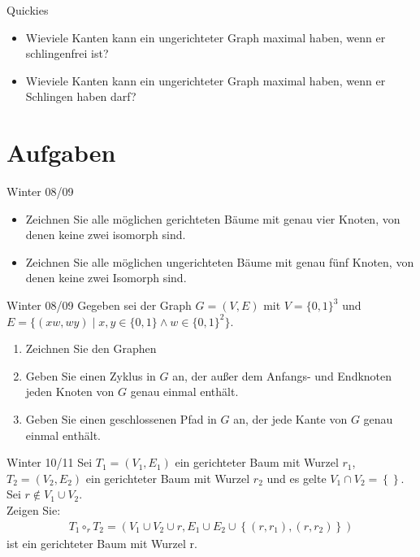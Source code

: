 \begin{frame}{Quickies}
    \begin{itemize}
        \item Wieviele Kanten kann ein ungerichteter Graph maximal haben, wenn er schlingenfrei ist? 
        \item Wieviele Kanten kann ein ungerichteter Graph maximal haben, wenn er Schlingen haben darf? 
    \end{itemize}
\end{frame}

\section{Aufgaben}
\begin{frame}{Winter 08/09}
    \begin{itemize}
        \item Zeichnen Sie alle möglichen gerichteten Bäume mit genau vier Knoten, von denen keine zwei isomorph sind.
        \item Zeichnen Sie alle möglichen ungerichteten Bäume mit genau fünf Knoten, von denen keine zwei Isomorph sind.
    \end{itemize}
\end{frame}

\begin{frame}{Winter 08/09}
    Gegeben sei der Graph $G=(V, E)$ mit $V=\{0, 1\}^3$ und $E=\{(xw, wy) \mid x, y \in \{0, 1\} \land w \in \{0, 1\}^2\}$.
    \begin{enumerate}
        \item Zeichnen Sie den Graphen
        \item Geben Sie einen Zyklus in $G$ an, der außer dem Anfangs- und Endknoten jeden Knoten von $G$ genau einmal enthält.
        \item Geben Sie einen geschlossenen Pfad in $G$ an, der jede Kante von $G$ genau einmal enthält.
    \end{enumerate}
\end{frame}

\begin{frame}{Winter 10/11}
    Sei $T_1 = \left( V_1, E_1 \right)$ ein gerichteter Baum mit Wurzel $r_1$, $T_2 = \left( V_2, E_2 \right)$ ein gerichteter Baum mit Wurzel $r_2$ und es gelte $V_1 \cap V_2 = \left\{  \right\}$. Sei $r \notin V_1 \cup V_2 $.\\
    Zeigen Sie:
    \begin{align*}
        T_1 \circ_r T_2 = \left( V_1 \cup V_2 \cup r, E_1 \cup E_2 \cup \left\{ \left( r, r_1 \right),\left( r,r_2 \right) \right\} \right)
    \end{align*}
    ist ein gerichteter Baum mit Wurzel r.
\end{frame}

